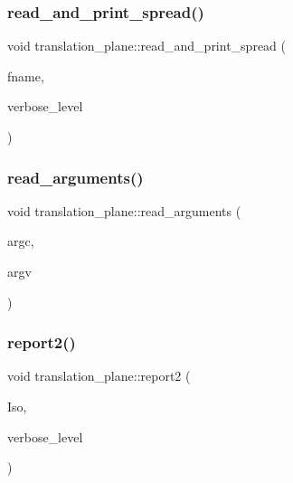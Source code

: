 \mbox{\label{classtranslation__plane_aca97c91e82942f18cb5a55897fdaa7d6}} 
\subsubsection{\texorpdfstring{read\+\_\+and\+\_\+print\+\_\+spread()}{read\_and\_print\_spread()}}
{\footnotesize\ttfamily void translation\+\_\+plane\+::read\+\_\+and\+\_\+print\+\_\+spread (\begin{DoxyParamCaption}\item[{const \mbox{\hyperlink{galois_8h_ab6cc7b4aeb6ea31aba2b3fbfc83ff5e6}{B\+Y\+TE}} $\ast$}]{fname,  }\item[{\mbox{\hyperlink{galois_8h_a09fddde158a3a20bd2dcadb609de11dc}{I\+NT}}}]{verbose\+\_\+level }\end{DoxyParamCaption})}

\mbox{\label{classtranslation__plane_adec05ec1a96ffe2b262da71c122435ba}} 
\subsubsection{\texorpdfstring{read\+\_\+arguments()}{read\_arguments()}}
{\footnotesize\ttfamily void translation\+\_\+plane\+::read\+\_\+arguments (\begin{DoxyParamCaption}\item[{int}]{argc,  }\item[{const char $\ast$$\ast$}]{argv }\end{DoxyParamCaption})}

\mbox{\label{classtranslation__plane_a75679a82804718b24c34936b7c278bb7}} 
\subsubsection{\texorpdfstring{report2()}{report2()}}
{\footnotesize\ttfamily void translation\+\_\+plane\+::report2 (\begin{DoxyParamCaption}\item[{\mbox{\hyperlink{classisomorph}{isomorph}} \&}]{Iso,  }\item[{\mbox{\hyperlink{galois_8h_a09fddde158a3a20bd2dcadb609de11dc}{I\+NT}}}]{verbose\+\_\+level }\end{DoxyParamCaption})}

